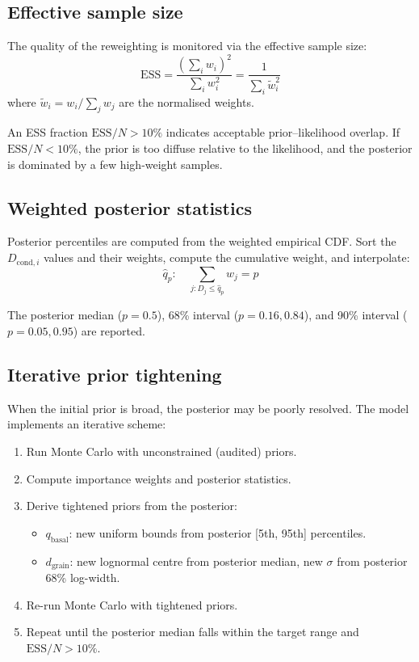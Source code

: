 \documentclass[11pt,a4paper]{article}
\begin{document}
\subsection{Effective sample size}

The quality of the reweighting is monitored via the effective sample
size:
\begin{equation}
\mathrm{ESS} = \frac{\left(\sum_i w_i\right)^2}{\sum_i w_i^2}
  = \frac{1}{\sum_i \tilde{w}_i^2}
\end{equation}
where $\tilde{w}_i = w_i / \sum_j w_j$ are the normalised weights.

An ESS fraction $\mathrm{ESS}/N > 10\%$ indicates acceptable
prior--likelihood overlap. If $\mathrm{ESS}/N < 10\%$, the prior
is too diffuse relative to the likelihood, and the posterior is
dominated by a few high-weight samples.

\subsection{Weighted posterior statistics}

Posterior percentiles are computed from the weighted empirical CDF.
Sort the $D_{\mathrm{cond},i}$ values and their weights, compute the
cumulative weight, and interpolate:
\begin{equation}
\hat{q}_p: \quad \sum_{j: D_j \leq \hat{q}_p} w_j = p
\end{equation}

The posterior median ($p = 0.5$), 68\% interval ($p = 0.16, 0.84$),
and 90\% interval ($p = 0.05, 0.95$) are reported.

\subsection{Iterative prior tightening}

When the initial prior is broad, the posterior may be poorly resolved.
The model implements an iterative scheme:

\begin{enumerate}[leftmargin=2em]
\item Run Monte Carlo with unconstrained (audited) priors.
\item Compute importance weights and posterior statistics.
\item Derive tightened priors from the posterior:
  \begin{itemize}
  \item $q_{\mathrm{basal}}$: new uniform bounds from posterior
        [5th, 95th] percentiles.
  \item $d_{\mathrm{grain}}$: new lognormal centre from posterior median,
        new $\sigma$ from posterior 68\% log-width.
  \end{itemize}
\item Re-run Monte Carlo with tightened priors.
\item Repeat until the posterior median falls within the target range
      and $\mathrm{ESS}/N > 10\%$.
\end{enumerate}
\end{document}
